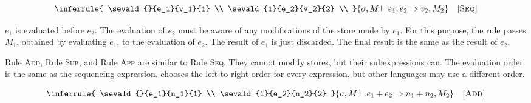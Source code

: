 
\vspace{-1em}

\[
  \inferrule
  {
    \sevald{}{e_1}{v_1}{1} \\
    \sevald{1}{e_2}{v_2}{2} \\
  }
  { \sevald{}{\eseq{e_1}{e_2}}{v_2}{2} }
  \quad\textsc{[Seq]}
\]

$e_1$ is evaluated before $e_2$. The evaluation of $e_2$ must be aware of
any modifications of the store made by $e_1$.
For this purpose, the rule passes $M_1$, obtained by evaluating
$e_1$, to the evaluation of $e_2$. The result of $e_1$ is just discarded.
The final result is the same as the result of $e_2$.

Rule \textsc{Add}, Rule \textsc{Sub}, and Rule \textsc{App} are similar to
Rule \textsc{Seq}. They cannot modify stores, but their subexpressions can. The
evaluation order is the same as the sequencing expression. \lang chooses
the left-to-right order for every expression, but other languages
may use a different order.


\vspace{-1em}

\[
  \inferrule
  {
    \sevald{}{e_1}{n_1}{1} \\
    \sevald{1}{e_2}{n_2}{2}
  }
  { \sevald{}{\eadd{e_1}{e_2}}{n_1+n_2}{2} }
  \quad\textsc{[Add]}
\]

\vspace{-1em}


